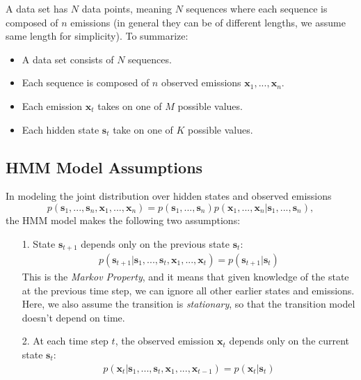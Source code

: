 A data set has $N$ data points, meaning $N$ sequences where each sequence is composed of $n$ emissions (in general they can be of different lengths, we assume same length for simplicity).
To summarize:
%
\begin{itemize}
	\item A data set consists of $N$ sequences.
	\item Each sequence is composed of $n$ observed emissions $\textbf{x}_1, ..., \textbf{x}_n$.
	\item Each emission $\textbf{x}_{t}$ takes on one of $M$ possible values.
	\item Each hidden state $\textbf{s}_{t}$ take on one of $K$ possible values.
\end{itemize}

\subsection{HMM Model Assumptions}


In modeling the joint distribution over hidden states and observed emissions
\begin{equation} \label{large-joint}
	p(\textbf{s}_1, ..., \textbf{s}_n, \textbf{x}_1, ..., \textbf{x}_n) = p(\textbf{s}_1, ..., \textbf{s}_n) p(\textbf{x}_1, ..., \textbf{x}_n | \textbf{s}_1, ..., \textbf{s}_n),
\end{equation}
%
the HMM model makes the following two assumptions:
%
\begin{itemize}
    \item[1.] State $\textbf{s}_{t+1}$ depends only on the previous state $\textbf{s}_t$:
	    \begin{align*}
	    	p(\textbf{s}_{t+1} | \textbf{s}_{1}, ..., \textbf{s}_{t}, \textbf{x}_{1}, ..., \textbf{x}_{t}) = p(\textbf{s}_{t+1} | \textbf{s}_{t}) 
	    \end{align*}
            This is the \textit{Markov Property}, and it means that given knowledge of the state at the previous time step, we can ignore all other earlier states and emissions. Here, we also assume the transition is \textit{stationary}, so that the transition model doesn't depend on time.
          \item[2.] At each time step $t$, the observed emission $\textbf{x}_t$ depends only on the current state $\textbf{s}_t$:
    	\begin{align*}
	    	p(\textbf{x}_{t} | \textbf{s}_{1}, ..., \textbf{s}_{t}, \textbf{x}_{1}, ..., \textbf{x}_{t-1}) = p(\textbf{x}_{t} | \textbf{s}_{t}) 
	    \end{align*}
          \end{itemize}
          
